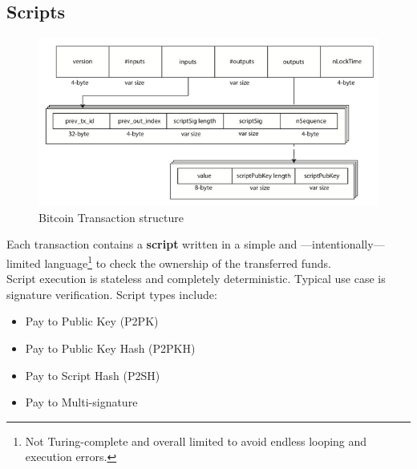 \subsection{Scripts}
\begin{figure}[htbp]
   \centering
   \includegraphics{images/bitcoin_transactionStructure.png}
   \caption{Bitcoin Transaction structure}
   \label{fig:bitcoin_transactionStructure}
\end{figure}

Each transaction contains a \textbf{script} written in a simple and ---intentionally--- limited language\footnote{Not Turing-complete and overall limited to avoid endless looping and execution errors.} to check the ownership of the transferred funds.\\
Script execution is stateless and completely deterministic.
Typical use case is signature verification.
Script types include:
\begin{itemize}
   \item Pay to Public Key (P2PK)
   \item Pay to Public Key Hash (P2PKH)
   \item Pay to Script Hash (P2SH)
   \item Pay to Multi-signature
\end{itemize}

